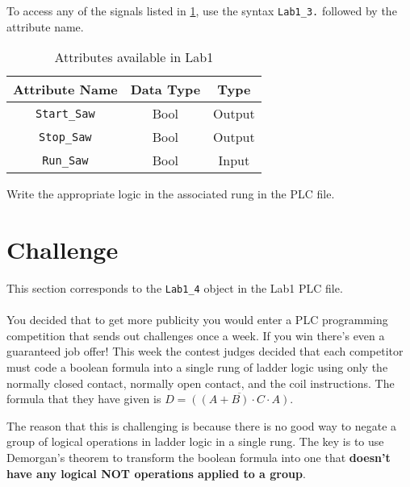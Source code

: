 To access any of the signals listed in \tableautorefname \ref{Table:Lab1_3Attributes}, use the syntax \verb|Lab1_3.| followed by the attribute name. 

\begin{table}[h]
\centering
\caption{Attributes available in Lab1}
\label{Table:Lab1_3Attributes}
\begin{tabular}{c c c}
\toprule
Attribute Name & Data Type & Type\\
\midrule
\verb|Start_Saw| & Bool & Output \\
\verb|Stop_Saw| &  Bool & Output \\
\midrule
\verb|Run_Saw| & Bool & Input\\
\bottomrule
\end{tabular}
\end{table}

Write the appropriate logic in the associated rung in the PLC file.

\TASignatureSlot



\section{Challenge}

This section corresponds to the \verb|Lab1_4| object in the Lab1 PLC file.
\\ 
\\

You decided that to get more publicity you would enter a PLC programming competition that sends out challenges once a week. If you win there's even a guaranteed job offer! This week the contest judges decided that each competitor must code a boolean formula into a single rung of ladder logic using only the normally closed contact, normally open contact, and the coil instructions. The formula that they have given is $D = \overline{((A+B)\cdot C\cdot A)}$. 

The reason that this is challenging is because there is no good way to negate a group of logical operations in ladder logic in a single rung. The key is to use Demorgan's theorem to transform the boolean formula into one that \textbf{doesn't have any logical NOT operations applied to a group}. 


